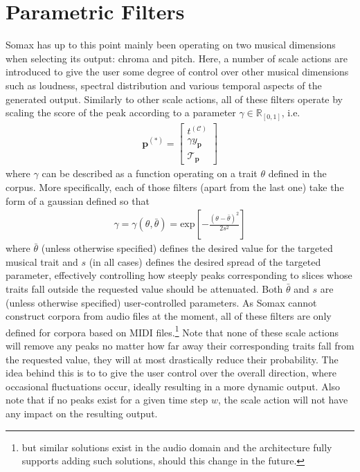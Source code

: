 \section{Parametric Filters}
Somax has up to this point mainly been operating on two musical dimensions when selecting its output: chroma and pitch. Here, a number of scale actions are introduced to give the user some degree of control over other musical dimensions such as loudness, spectral distribution and various temporal aspects of the generated output.  Similarly to other scale actions, all of these filters operate by scaling the score of the peak according to a parameter $\gamma \in \mathbb R_{[0,1]}$, i.e.
	\begin{align}\label{eq:filter-scaling}
		\bm p^{(\ast)} = \begin{bmatrix}
			t^{(\mathcal C)} \\ \gamma y_{\bm p} \\ \mathcal T_{\bm p}
		\end{bmatrix}
	\end{align}
	where $\gamma$ can be described as a function operating on a trait $\theta$  defined in the corpus. More specifically, each of those filters (apart from the last one) take the form of a gaussian defined so that
	\begin{align}
		\gamma = \gamma\left(\theta,\bar{\theta}\right) = \text{exp}\left[-\frac{(\theta-\bar{\theta})^2}{2s^2}\right]
	\end{align}
	where $\bar{\theta}$ (unless otherwise specified) defines the desired value for the targeted musical trait and $s$ (in all cases) defines the desired spread of the targeted parameter, effectively controlling how steeply peaks corresponding to slices whose traits fall outside the requested value should be attenuated. Both $\bar{\theta}$ and $s$ are (unless otherwise specified) user-controlled parameters. As Somax cannot construct corpora from audio files at the moment, all of these filters are only defined for corpora based on MIDI files.\footnote{but similar solutions exist in the audio domain and the architecture fully supports adding such solutions, should this change in the future.} Note that none of these scale actions will remove any peaks no matter how far away their corresponding traits fall from the requested value, they will at most drastically reduce their probability. The idea behind this is to to give the user control over the overall direction, where occasional fluctuations occur, ideally resulting in a more dynamic output. Also note that if no peaks exist for a given time step $w$, the scale action will not have any impact on the resulting output.
	
